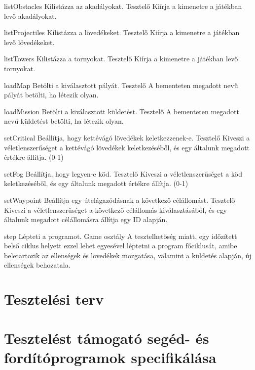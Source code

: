 \usecase
{listObstacles}
{Kilistázza az akadályokat.}
{Tesztelő}
{Kiírja a kimenetre a játékban levő akadályokat.}

\usecase
{listProjectiles}
{Kilistázza a lövedékeket.}
{Tesztelő}
{Kiírja a kimenetre a játékban levő lövedékeket.}

\usecase
{listTowers}
{Kilistázza a tornyokat.}
{Tesztelő}
{Kiírja a kimenetre a játékban levő tornyokat.}

\usecase
{loadMap}
{Betölti a kiválasztott pályát.}
{Tesztelő}
{A bementeten megadott nevű pályát betölti, ha létezik olyan.}

\usecase
{loadMission}
{Betölti a kiválasztott küldetést.}
{Tesztelő}
{A bementeten megadott nevű küldetést betölti, ha létezik olyan.}

\usecase
{setCritical}
{Beállítja, hogy kettévágó lövedékek keletkezzenek-e.}
{Tesztelő}
{Kiveszi a véletlenszerűséget a kettévágó lövedékek keletkezéséből, és egy általunk megadott értékre állítja. (0-1)}

\usecase
{setFog}
{Beállítja, hogy legyen-e köd.}
{Tesztelő}
{Kiveszi a véletlenszerűséget a köd keletkezéséből, és egy általunk megadott értékre állítja. (0-1)}

\usecase
{setWaypoint}
{Beállítja egy útelágazódásnak a következő célállomást.}
{Tesztelő}
{Kiveszi a véletlenszerűséget a következő célállomás kiválasztásából, és egy általunk megadott célállomásra állítja egy ID alapján.}

\usecase
{step}
{Lépteti a programot.}
{Game osztály}
{A tesztelhetőség miatt, egy időzített belső ciklus helyett ezzel lehet egyesével léptetni a program főciklusát,
 amibe beletartozik az ellenségek és lövedékek mozgatása, valamint a küldetés alapján, új ellenségek behozatala.}

\section{Tesztelési terv}


\section{Tesztelést támogató segéd- és fordítóprogramok specifikálása}

